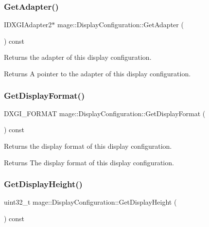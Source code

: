 \subsubsection{\texorpdfstring{Get\+Adapter()}{GetAdapter()}}
{\footnotesize\ttfamily I\+D\+X\+G\+I\+Adapter2$\ast$ mage\+::\+Display\+Configuration\+::\+Get\+Adapter (\begin{DoxyParamCaption}{ }\end{DoxyParamCaption}) const\hspace{0.3cm}{\ttfamily [noexcept]}}

Returns the adapter of this display configuration.

\begin{DoxyReturn}{Returns}
A pointer to the adapter of this display configuration. 
\end{DoxyReturn}
\hypertarget{structmage_1_1_display_configuration_a412215b18edac3ec6bf18cd00d8c689b}{}\label{structmage_1_1_display_configuration_a412215b18edac3ec6bf18cd00d8c689b} 
\subsubsection{\texorpdfstring{Get\+Display\+Format()}{GetDisplayFormat()}}
{\footnotesize\ttfamily D\+X\+G\+I\+\_\+\+F\+O\+R\+M\+AT mage\+::\+Display\+Configuration\+::\+Get\+Display\+Format (\begin{DoxyParamCaption}{ }\end{DoxyParamCaption}) const\hspace{0.3cm}{\ttfamily [noexcept]}}

Returns the display format of this display configuration.

\begin{DoxyReturn}{Returns}
The display format of this display configuration. 
\end{DoxyReturn}
\hypertarget{structmage_1_1_display_configuration_ad8deade0aec6e88e41fee0ba688cbec9}{}\label{structmage_1_1_display_configuration_ad8deade0aec6e88e41fee0ba688cbec9} 
\subsubsection{\texorpdfstring{Get\+Display\+Height()}{GetDisplayHeight()}}
{\footnotesize\ttfamily uint32\+\_\+t mage\+::\+Display\+Configuration\+::\+Get\+Display\+Height (\begin{DoxyParamCaption}{ }\end{DoxyParamCaption}) const\hspace{0.3cm}{\ttfamily [noexcept]}}

